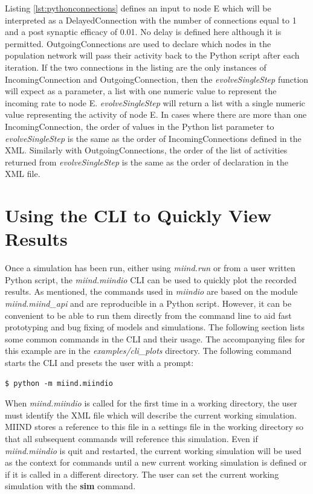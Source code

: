 \documentclass[utf8]{frontiersSCNS} %
\begin{document}
Listing \ref{lst:pythonconnections} defines an input to node E which will be interpreted as a DelayedConnection with the number of connections equal to 1 and a post synaptic efficacy of 0.01. No delay is defined here although it is permitted. OutgoingConnections are used to declare which nodes in the population network will pass their activity back to the Python script after each iteration. If the two connections in the listing are the only instances of IncomingConnection and OutgoingConnection, then the \textit{evolveSingleStep} function will expect as a parameter, a list with one numeric value to represent the incoming rate to node E. \textit{evolveSingleStep} will return a list with a single numeric value representing the activity of node E. In cases where there are more than one IncomingConnection, the order of values in the Python list parameter to \textit{evolveSingleStep} is the same as the order of IncomingConnections defined in the XML. Similarly with OutgoingConnections, the order of the list of activities returned from \textit{evolveSingleStep} is the same as the order of declaration in the XML file.

\section{Using the CLI to Quickly View Results}
\label{workflow}
Once a simulation has been run, either using \textit{miind.run} or from a user written Python script, the \textit{miind.miindio} CLI can be used to quickly plot the recorded results. As mentioned, the commands used in \textit{miindio} are based on the module \textit{miind.miind\_api} and are reproducible in a Python script. However, it can be convenient to be able to run them directly from the command line to aid fast prototyping and bug fixing of models and simulations. The following section lists some common commands in the CLI and their usage. The accompanying files for this example are in the \textit{examples/cli\_plots} directory. The following command starts the CLI and presets the user with a prompt:

\begin{lstlisting}[language=xml,caption={Run the CLI.}]
$ python -m miind.miindio
\end{lstlisting}

When \textit{miind.miindio} is called for the first time in a working directory, the user must identify the XML file which will describe the current working simulation. MIIND stores a reference to this file in a settings file in the working directory so that all subsequent commands will reference this simulation. Even if \textit{miind.miindio} is quit and restarted, the current working simulation will be used as the context for commands until a new current working simulation is defined or if it is called in a different directory. The user can set the current working simulation with the \textbf{sim} command. \\
\end{document}
